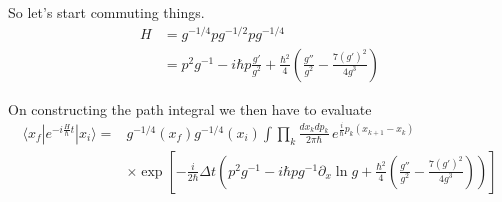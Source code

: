So let's start commuting things.  
\begin{align}
H &= g^{-1/4}p  g^{-1/2}p g^{-1/4}\\
& =  p^2 g^{-1} - i\hbar p\frac{g'}{g^{2}}  +\frac{\hbar^2}{4}\left(\frac{g''}{g^{2}}- \frac{7(g')^2}{4g^{3}}\right)
\end{align}

On constructing the path integral we then have to evaluate 
\begin{align}
\langle x_f| e^{-i\frac{H}{\hbar}t} |x_i\rangle =& g^{-1/4}(x_f)g^{-1/4}(x_i)\int\prod_k \frac{dx_k dp_k}{2\pi\hbar}\, e^{\frac{i}{\hbar}p_k(x_{k+1}-x_k)}\nonumber\\
&\times\exp\left[ -\frac{i}{2\hbar}\Delta t\left(  p^2g^{-1} - i\hbar p g^{-1}\partial_x \ln g  +\frac{\hbar^2}{4}\left(\frac{g''}{g^{2}}- \frac{7(g')^2}{4g^{3}}\right)\right)\right]
\end{align}

